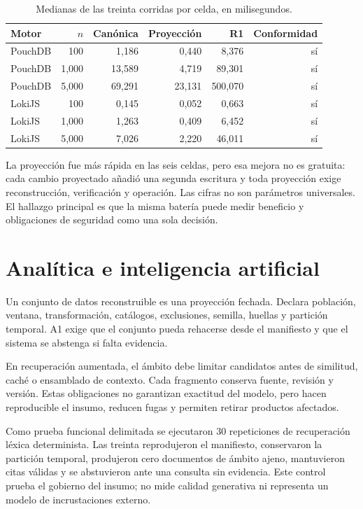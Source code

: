 \documentclass[11pt]{article}
\begin{document}
\begin{table}[h]
\centering
\caption{Medianas de las treinta corridas por celda, en milisegundos.}
\begin{tabular}{lrrrrr}
\toprule Motor & $n$ & Canónica & Proyección & R1 & Conformidad\\ \midrule
PouchDB & 100 & 1,186 & 0,440 & 8,376 & sí\\
PouchDB & 1,000 & 13,589 & 4,719 & 89,301 & sí\\
PouchDB & 5,000 & 69,291 & 23,131 & 500,070 & sí\\
LokiJS & 100 & 0,145 & 0,052 & 0,663 & sí\\
LokiJS & 1,000 & 1,263 & 0,409 & 6,452 & sí\\
LokiJS & 5,000 & 7,026 & 2,220 & 46,011 & sí\\ \bottomrule
\end{tabular}
\end{table}

La proyección fue más rápida en las seis celdas, pero esa mejora no es gratuita: cada cambio proyectado añadió una segunda escritura y toda proyección exige reconstrucción, verificación y operación. Las cifras no son parámetros universales. El hallazgo principal es que la misma batería puede medir beneficio y obligaciones de seguridad como una sola decisión.

\section{Analítica e inteligencia artificial}
Un conjunto de datos reconstruible es una proyección fechada. Declara población, ventana, transformación, catálogos, exclusiones, semilla, huellas y partición temporal. A1 exige que el conjunto pueda rehacerse desde el manifiesto y que el sistema se abstenga si falta evidencia.

En recuperación aumentada, el ámbito debe limitar candidatos antes de similitud, caché o ensamblado de contexto. Cada fragmento conserva fuente, revisión y versión. Estas obligaciones no garantizan exactitud del modelo, pero hacen reproducible el insumo, reducen fugas y permiten retirar productos afectados.

Como prueba funcional delimitada se ejecutaron 30 repeticiones de recuperación léxica determinista. Las treinta reprodujeron el manifiesto, conservaron la partición temporal, produjeron cero documentos de ámbito ajeno, mantuvieron citas válidas y se abstuvieron ante una consulta sin evidencia. Este control prueba el gobierno del insumo; no mide calidad generativa ni representa un modelo de incrustaciones externo.
\end{document}
